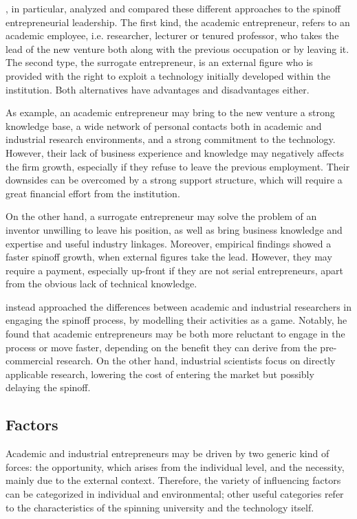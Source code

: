 \citet{Radosevich1995}, in particular, analyzed and compared these different approaches to the spinoff entrepreneurial leadership. The first kind, the academic entrepreneur, refers to an academic employee, i.e. researcher, lecturer or tenured professor, who takes the lead of the new venture both along with the previous occupation or by leaving it. The second type, the surrogate entrepreneur, is an external figure who is provided with the right to exploit a technology initially developed within the institution. Both alternatives have advantages and disadvantages either.

As example, an academic entrepreneur may bring to the new venture a strong knowledge base, a wide network of personal contacts both in academic and industrial research environments, and a strong commitment to the technology. However, their lack of business experience and knowledge may negatively affects the firm growth, especially if they refuse to leave the previous employment. Their downsides can be overcomed by a strong support structure, which will require a great financial effort from the institution. 

On the other hand, a surrogate entrepreneur may solve the problem of an inventor unwilling to leave his position, as well as bring business knowledge and expertise and useful industry linkages. Moreover, empirical findings showed a faster spinoff growth, when external figures take the lead. However, they may require a payment, especially up-front if they are not serial entrepreneurs, apart from the obvious lack of technical knowledge. 

\citet{Lacetera2006} instead approached the differences between academic and industrial researchers in engaging the spinoff process, by modelling their activities as a game. Notably, he found that academic entrepreneurs may be both more reluctant to engage in the process or move faster, depending on the benefit they can derive from the pre-commercial research. On the other hand, industrial scientists focus on directly applicable research, lowering the cost of entering the market but possibly delaying the spinoff.   

\subsection{Factors}

Academic and industrial entrepreneurs may be driven by two generic kind of forces: the opportunity, which arises from the individual level, and the necessity, mainly due to the external context. Therefore, the variety of influencing factors can be categorized in individual and environmental; other useful categories refer to the characteristics of the spinning university and the technology itself.


